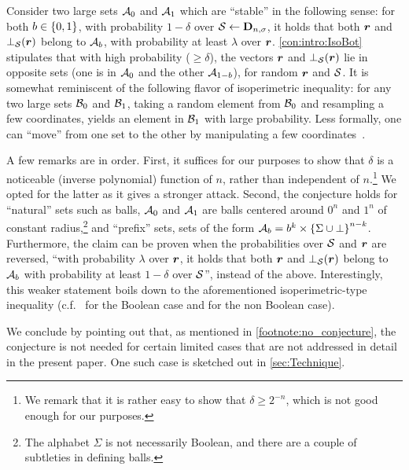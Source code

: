 \begin{conjecture}\label{con:intro:IsoBot}
\MainConj
\end{conjecture}

\noindent
Consider two large sets $\mathcal{A}_0$ and $\mathcal{A}_1$ which are ``stable'' in the following sense: for both $b\in \{0,1\}$, with probability $1-\delta$ over $\mathcal{S}\gets \mathbf{D}_{n,\sigma}$, it holds that both ${ \boldsymbol{r}}$ and $\bot_{\mathcal{S}}({ \boldsymbol{r}})$ belong to $\mathcal{A}_b$, with probability at least $\lambda$ over ${ \boldsymbol{r}}$. \cref{con:intro:IsoBot} stipulates that with high probability ($\ge \delta$), the vectors ${ \boldsymbol{r}}$ and $\bot_{\mathcal{S}}({ \boldsymbol{r}})$ lie in opposite sets (\ie one is in $\mathcal{A}_0$ and the other $\mathcal{A}_{1-b}$), for random ${ \boldsymbol{r}}$ and $\mathcal{S}$. It is somewhat reminiscent of the following flavor of isoperimetric inequality: for any two large sets $\mathcal{B}_0$ and $\mathcal{B}_1$, taking a random element from $\mathcal{B}_0$ and resampling a few coordinates, yields an element in $\mathcal{B}_1$ with large probability. Less formally, one can ``move'' from one set to the other by manipulating a few coordinates~\cite{MosselORSS2006,MosselOS2013}.

A few remarks are in order. First, it suffices for our purposes to show that $\delta$ is a noticeable (\ie inverse polynomial) function of $n$, rather than independent of $n$.\footnote{We remark that it is rather easy to show that $\delta\ge 2^{-n}$, which is not good enough for our purposes.} We opted for the latter as it gives a stronger attack. Second, the conjecture holds for ``natural'' sets such as balls, \ie $\mathcal{A}_0$ and $\mathcal{A}_1$ are balls centered around $0^n$ and $1^n$ of constant radius,\footnote{The alphabet $\Sigma$ is not necessarily Boolean, and there are a couple of subtleties in defining balls.} and ``prefix'' sets, \ie sets of the form $\mathcal{A}_b=b^k \times \left\{\Sigma \cup \bot\right\}^{n-k}$. Furthermore, the claim can be proven when the probabilities over $\mathcal{S}$ and ${ \boldsymbol{r}}$ are reversed, \ie ``with probability $\lambda$ over ${ \boldsymbol{r}}$, it holds that both ${ \boldsymbol{r}}$ and $\bot_{\mathcal{S}}({ \boldsymbol{r}})$ belong to $\mathcal{A}_b$ with probability at least $1-\delta$ over $\mathcal{S}$'', instead of the above. Interestingly, this weaker statement boils down to the aforementioned isoperimetric-type inequality (c.f.~\cite{MosselORSS2006} for the Boolean case and \cite{MosselOS2013} for the non Boolean case).

We conclude by pointing out that, as mentioned in \cref{footnote:no_conjecture}, the conjecture is not needed for certain limited cases that are not addressed in detail in the present paper. One such case is sketched out in \cref{sec:Technique}.

